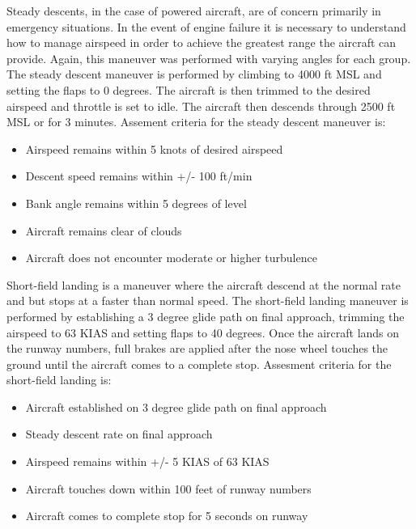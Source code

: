 \documentclass[conf]{new-aiaa}
\begin{document}
\medskip

Steady descents, in the case of powered aircraft, are of concern primarily in emergency situations. In the event of engine failure it is necessary to understand how to manage airspeed in order to achieve the greatest range the aircraft can provide. Again, this maneuver was performed with varying angles for each group. The steady descent maneuver is performed by climbing to 4000 ft MSL and setting the flaps to 0 degrees. The aircraft is then trimmed to the desired airspeed and throttle is set to idle. The aircraft then descends through 2500 ft MSL or for 3 minutes. Assement criteria for the steady descent maneuver is:

\medskip

\begin{itemize}
\item Airspeed remains within 5 knots of desired airspeed
\item Descent speed remains within +/- 100 ft/min
\item Bank angle remains within 5 degrees of level 
\item Aircraft remains clear of clouds
\item Aircraft does not encounter moderate or higher turbulence
\end{itemize}

\medskip

Short-field landing is a maneuver where the aircraft descend at the normal rate and but stops at a faster than normal speed. The short-field landing maneuver is performed by establishing a 3 degree glide path on final approach, trimming the airspeed to 63 KIAS and setting flaps to 40 degrees. Once the aircraft lands on the runway numbers, full brakes are applied after the nose wheel touches the ground until the aircraft comes to a complete stop. Assesment criteria for the short-field landing is:

\medskip

\begin{itemize}
\item Aircraft established on 3 degree glide path on final approach
\item Steady descent rate on final approach
\item Airspeed remains within +/- 5 KIAS of 63 KIAS  
\item Aircraft touches down within 100 feet of runway numbers
\item Aircraft comes to complete stop for 5 seconds on runway
\end{itemize}
\end{document}
